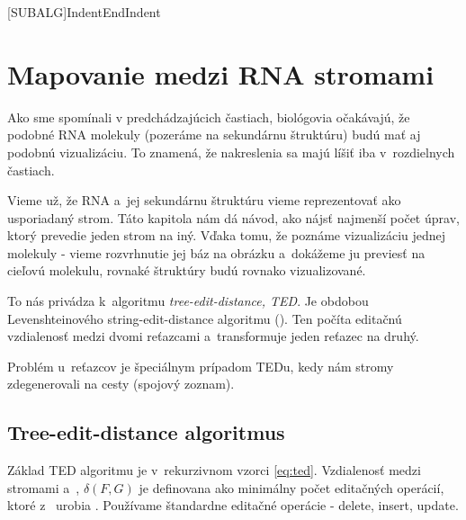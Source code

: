 \newcommand{\Cdel}{\ensuremath{c_{del}}}
\newcommand{\Cins}{\ensuremath{c_{ins}}}
\newcommand{\Cupd}{\ensuremath{c_{upd}}}

\newcommand{\AfullDecomposition}{\ensuremath{\mathcal{A}}}
\newcommand{\FrelevantSubforests}{\ensuremath{\mathcal{F}}}
\newcommand{\pluseq}{\stackrel{+}{=}}
\newcommand{\AlgCase}{$\left\{\rule{0pt}{\baselineskip}\right.$\parbox{\textwidth}}

\newcommand{\rtedCostSum}[3]{\sum_{{#1}' \in #1 - \gamma^{#2}(#1)}cena({#1}', #3)}
\newcommand{\set}[1]{\ensuremath{\{#1\}}}


[SUBALG]{Indent}{EndIndent}{}{\algorithmicend\ }




\chapter{Mapovanie medzi RNA stromami}

Ako sme spomínali v predchádzajúcich častiach, biológovia očakávajú, že
podobné RNA molekuly (pozeráme na sekundárnu štruktúru) budú mať aj podobnú vizualizáciu.
To znamená, že nakreslenia sa majú líšiť iba v~rozdielnych častiach.

Vieme už, že RNA a~jej sekundárnu štruktúru vieme reprezentovať ako usporiadaný strom.
Táto kapitola nám dá návod, ako nájsť najmenší počet úprav, ktorý prevedie jeden strom
na iný. Vďaka tomu, že poznáme vizualizáciu jednej molekuly - vieme rozvrhnutie jej báz na
obrázku a~dokážeme ju previesť na cieľovú molekulu, rovnaké štruktúry budú rovnako vizualizované.

To nás privádza k~algoritmu \textit{tree-edit-distance, TED}. Je obdobou Levenshteinového
string-edit-distance algoritmu (\citet{LEVENSHTEIN}).
Ten počíta editačnú vzdialenosť medzi dvomi reťazcami a~transformuje
jeden reťazec na druhý.

Problém u~reťazcov je špeciálnym prípadom TEDu, kedy nám stromy zdegenerovali
na cesty (spojový zoznam).





\section{Tree-edit-distance algoritmus}

Základ TED algoritmu je v~rekurzivnom vzorci \ref{eq:ted}. Vzdialenosť medzi
stromami  a~, $\delta(F, G)$ je definovana ako minimálny počet editačných operácií,
ktoré z~ urobia . Používame štandardne editačné operácie - delete, insert, update.

